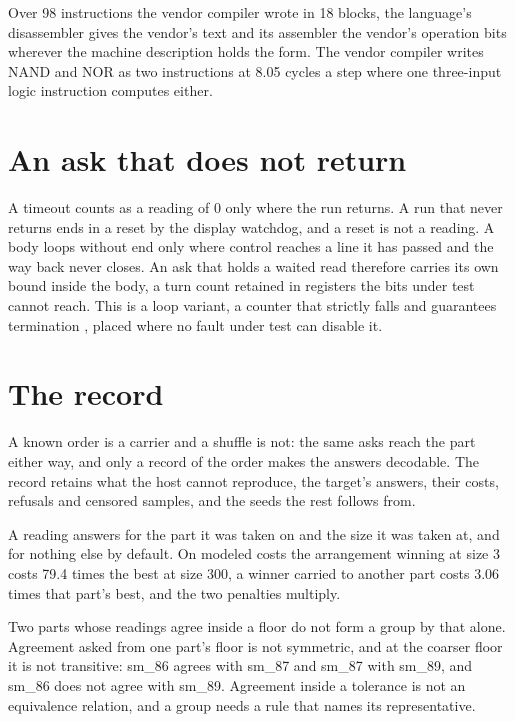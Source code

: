 Over 98 instructions the vendor compiler wrote in 18 blocks, the language's disassembler gives
the vendor's text and its assembler the vendor's operation bits wherever the machine description
holds the form. The vendor compiler writes NAND and NOR as two instructions at 8.05 cycles a step
where one three-input logic instruction computes either.

\section{An ask that does not return}

A timeout counts as a reading of 0 only where the run returns. A run that never returns ends in a
reset by the display watchdog, and a reset is not a reading. A body loops without end only where
control reaches a line it has passed and the way back never closes. An ask that holds a waited
read therefore carries its own bound inside the body, a turn count retained in registers the bits
under test cannot reach. This is a loop variant, a counter that strictly falls and guarantees
termination \cite{src:Floyd}, placed where no fault under test can disable it.

\section{The record}

A known order is a carrier and a shuffle is not: the same asks reach the part either way, and
only a record of the order makes the answers decodable. The record retains what the host cannot
reproduce, the target's answers, their costs, refusals and censored samples, and the seeds the
rest follows from.

A reading answers for the part it was taken on and the size it was taken at, and for nothing else
by default. On modeled costs the arrangement winning at size 3 costs 79.4 times the best at size
300, a winner carried to another part costs 3.06 times that part's best, and the two penalties
multiply.

Two parts whose readings agree inside a floor do not form a group by that alone. Agreement asked
from one part's floor is not symmetric, and at the coarser floor it is not transitive: sm\_86
agrees with sm\_87 and sm\_87 with sm\_89, and sm\_86 does not agree with sm\_89. Agreement inside
a tolerance is not an equivalence relation, and a group needs a rule that names its
representative.

